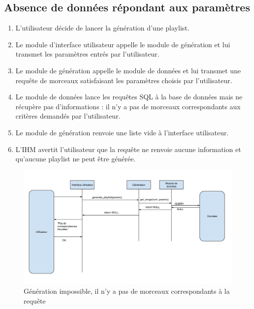 \subsection{Absence de données répondant aux paramètres}
\label{scenarii:gen:nodata}

\begin{enumerate}
\item L'utilisateur décide de lancer la génération d'une playlist.
\item Le module d'interface utilisateur appelle le module de génération et 
lui transmet les paramètres entrés par l'utilisateur.
\item Le module de génération appelle le module de données et lui transmet 
une requête de morceaux satisfaisant les paramètres choisis par l'utilisateur.
\item Le module de données lance les requêtes SQL à la base de données mais 
ne récupère pas d'informations : il n'y a pas de morceaux correspondants aux 
critères demandés par l'utilisateur.
\item Le module de génération renvoie une liste vide à l'interface 
utilisateur.
\item L'IHM avertit l'utilisateur que la requête ne renvoie aucune 
information et qu'aucune playlist ne peut être générée.
\end{enumerate}

\begin{figure}[H]
\includegraphics[width=\textwidth]{data/scenarii/generation_nulle.png}
\caption{Génération impossible, il n'y a pas de morceaux correspondants à la requête}
\end{figure}